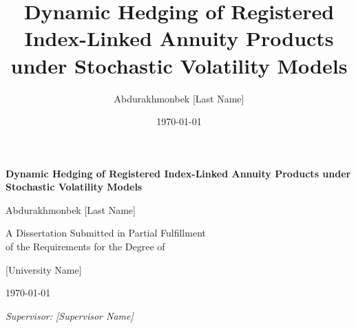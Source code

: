 \documentclass[12pt,a4paper]{report}
\title{Dynamic Hedging of Registered Index-Linked Annuity Products under Stochastic Volatility Models}
\author{Abdurakhmonbek [Last Name]}
\date{\today}
\begin{document}
\begin{titlepage}
\centering
\vspace*{2cm}

{\LARGE\textbf{Dynamic Hedging of Registered Index-Linked Annuity Products under Stochastic Volatility Models}}

\vspace{2cm}

{\Large Abdurakhmonbek [Last Name]}

\vspace{1.5cm}

{\large A Dissertation Submitted in Partial Fulfillment\\
of the Requirements for the Degree of\\
[Degree Title]}

\vspace{1.5cm}

{\large [University Name]\\
[Department/School Name]}

\vspace{2cm}

{\large \today}

\vfill

\textit{Supervisor: [Supervisor Name]}

\end{titlepage}
\end{document}
